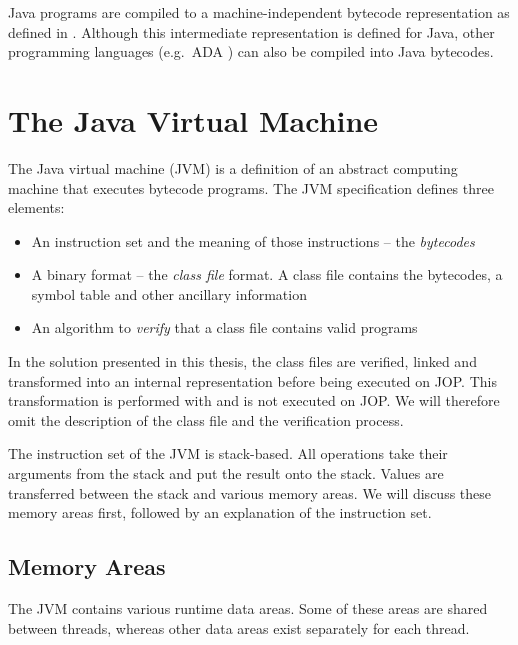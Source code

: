 Java programs are compiled to a machine-independent bytecode
representation as defined in \cite{jvm}. Although this intermediate
representation is defined for Java, other programming languages
(e.g.\ ADA \cite{269646}) can also be compiled into Java bytecodes.

\section{The Java Virtual Machine}

The Java virtual machine (JVM) is a definition of an abstract
computing machine that executes bytecode programs. The JVM
specification \cite{jvm} defines three elements:
\begin{itemize}
    \item An instruction set and the meaning of those instructions
    -- the \emph{bytecodes}
    \item A binary format -- the \emph{class file} format. A
    class file contains the bytecodes, a symbol table and other
    ancillary information
    \item An algorithm to \emph{verify} that a class file
    contains valid programs
\end{itemize}
%
In the solution presented in this thesis, the class files are
verified, linked and transformed into an internal representation
before being executed on JOP. This transformation is performed with
 and is not executed on JOP. We will therefore
omit the description of the class file and the verification process.

The instruction set of the JVM is stack-based. All operations take
their arguments from the stack and put the result onto the stack.
Values are transferred between the stack and various memory areas.
We will discuss these memory areas first, followed by an explanation
of the instruction set.

\subsection{Memory Areas}

The JVM contains various runtime data areas. Some of these areas are
shared between threads, whereas other data areas exist separately
for each thread.

